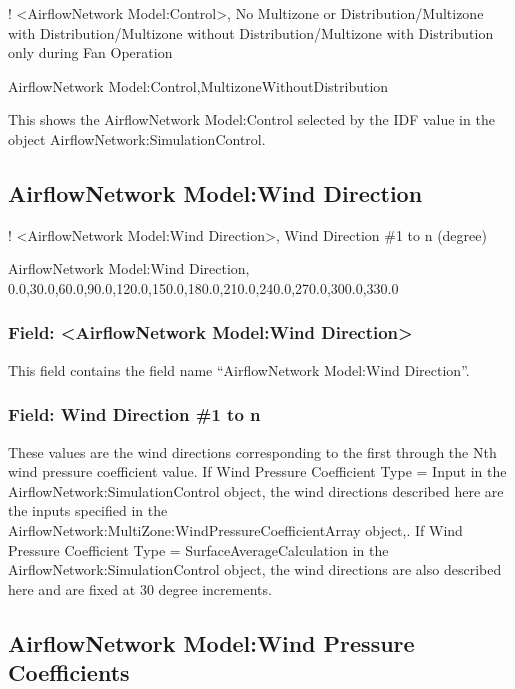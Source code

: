 ! \textless{}AirflowNetwork Model:Control\textgreater{}, No Multizone or Distribution/Multizone with Distribution/Multizone without Distribution/Multizone with Distribution only during Fan Operation

AirflowNetwork Model:Control,MultizoneWithoutDistribution

This shows the AirflowNetwork Model:Control selected by the IDF value in the object AirflowNetwork:SimulationControl.

\subsection{AirflowNetwork Model:Wind Direction}\label{airflownetwork-modelwind-direction}

! \textless{}AirflowNetwork Model:Wind Direction\textgreater{}, Wind Direction \#1 to n (degree)

AirflowNetwork Model:Wind Direction, 0.0,30.0,60.0,90.0,120.0,150.0,180.0,210.0,240.0,270.0,300.0,330.0

\subsubsection{Field: \textless{}AirflowNetwork Model:Wind Direction\textgreater{}}\label{field-airflownetwork-modelwind-direction}

This field contains the field name ``AirflowNetwork Model:Wind Direction''.

\subsubsection{Field: Wind Direction \#1 to n}\label{field-wind-direction-1-to-n}

These values are the wind directions corresponding to the first through the Nth wind pressure coefficient value. If Wind Pressure Coefficient Type = Input in the AirflowNetwork:SimulationControl object, the wind directions described here are the inputs specified in the AirflowNetwork:MultiZone:WindPressureCoefficientArray object,. If Wind Pressure Coefficient Type = SurfaceAverageCalculation in the AirflowNetwork:SimulationControl object, the wind directions are also described here and are fixed at 30 degree increments.

\subsection{AirflowNetwork Model:Wind Pressure Coefficients}\label{airflownetwork-modelwind-pressure-coefficients}

